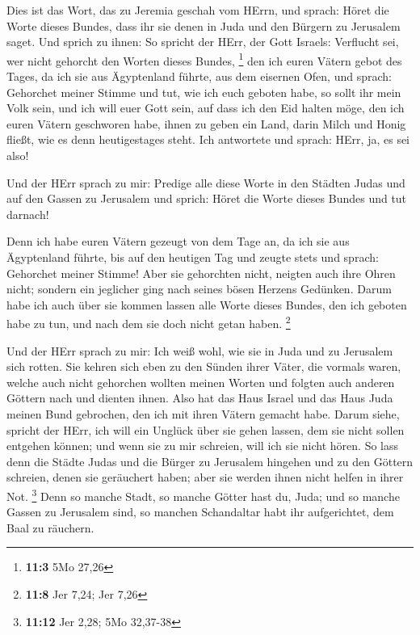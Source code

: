  Dies ist das Wort, das zu Jeremia geschah vom HErrn, und
sprach:  Höret die Worte dieses Bundes, dass ihr sie denen
in Juda und den Bürgern zu Jerusalem saget.  Und sprich zu
ihnen: So spricht der HErr, der Gott Israels: Verflucht sei, wer nicht
gehorcht den Worten dieses Bundes, \footnote{\textbf{11:3} 5Mo 27,26}
 den ich euren Vätern gebot des Tages, da ich sie aus
Ägyptenland führte, aus dem eisernen Ofen, und sprach: Gehorchet meiner
Stimme und tut, wie ich euch geboten habe, so sollt ihr mein Volk sein,
und ich will euer Gott sein,  auf dass ich den Eid halten
möge, den ich euren Vätern geschworen habe, ihnen zu geben ein Land,
darin Milch und Honig fließt, wie es denn heutigestages steht. Ich
antwortete und sprach: HErr, ja, es sei also!

 Und der HErr sprach zu mir: Predige alle diese Worte in den
Städten Judas und auf den Gassen zu Jerusalem und sprich: Höret die
Worte dieses Bundes und tut darnach!

 Denn ich habe euren Vätern gezeugt von dem Tage an, da ich
sie aus Ägyptenland führte, bis auf den heutigen Tag und zeugte stets
und sprach: Gehorchet meiner Stimme!  Aber sie gehorchten
nicht, neigten auch ihre Ohren nicht; sondern ein jeglicher ging nach
seines bösen Herzens Gedünken. Darum habe ich auch über sie kommen
lassen alle Worte dieses Bundes, den ich geboten habe zu tun, und nach
dem sie doch nicht getan haben. \footnote{\textbf{11:8} Jer 7,24; Jer
  7,26}

 Und der HErr sprach zu mir: Ich weiß wohl, wie sie in Juda
und zu Jerusalem sich rotten.  Sie kehren sich eben zu den
Sünden ihrer Väter, die vormals waren, welche auch nicht gehorchen
wollten meinen Worten und folgten auch anderen Göttern nach und dienten
ihnen. Also hat das Haus Israel und das Haus Juda meinen Bund gebrochen,
den ich mit ihren Vätern gemacht habe.  Darum siehe,
spricht der HErr, ich will ein Unglück über sie gehen lassen, dem sie
nicht sollen entgehen können; und wenn sie zu mir schreien, will ich sie
nicht hören.  So lass denn die Städte Judas und die Bürger
zu Jerusalem hingehen und zu den Göttern schreien, denen sie geräuchert
haben; aber sie werden ihnen nicht helfen in ihrer Not. \footnote{\textbf{11:12}
  Jer 2,28; 5Mo 32,37-38}  Denn so manche Stadt, so manche
Götter hast du, Juda; und so manche Gassen zu Jerusalem sind, so manchen
Schandaltar habt ihr aufgerichtet, dem Baal zu räuchern.

